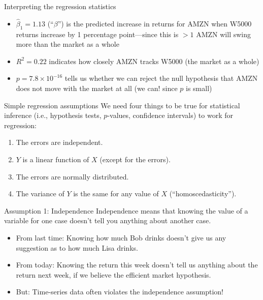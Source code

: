 \documentclass{beamer}\usepackage[]{graphicx}\usepackage[]{color}
\begin{document}
\begin{darkframes}
    \begin{frame}{Interpreting the regression statistics}
      \begin{itemize}[<+->]
        \item $\hat\beta_1=1.13$ (``$\beta$'') is the predicted increase in returns for AMZN when W5000 returns increase by 1 percentage point---since this is $>1$ AMZN will swing more than the market as a whole
        \item $R^2=0.22$ indicates how closely AMZN tracks W5000 (the market as a whole)
        \item $p=\ensuremath{7.8\times 10^{-16}}$ tells us whether we can reject the null hypothesis that AMZN does not move with the market at all \pause (we can! since $p$ is small)
      \end{itemize}
    \end{frame}

    \begin{frame}{Simple regression assumptions}
      We need four things to be true for statistical inference (i.e., hypothesis tests, $p$-values, confidence intervals) to work for regression:
      \pause
      \begin{enumerate}
        \item The errors are independent.
        \item $Y$ is a linear function of $X$ (except for the errors).
        \item The errors are normally distributed.
        \item The variance of $Y$ is the same for any value of $X$ (``homoscedasticity'').
      \end{enumerate}
    \end{frame}

    \begin{frame}{Assumption 1: Independence}
      Independence means that knowing the value of a variable for one case doesn't tell you anything about another case.

      \begin{itemize}[<+->]
        \item From last time: Knowing how much Bob drinks doesn't give us any suggestion as to how much Lisa drinks.
        \item From today: Knowing the return this week doesn't tell us anything about the return next week, if we believe the efficient market hypothesis.
        \item \alert{But:} Time-series data often violates the independence assumption!
      \end{itemize}
    \end{frame}


\end{darkframes}
\end{document}
